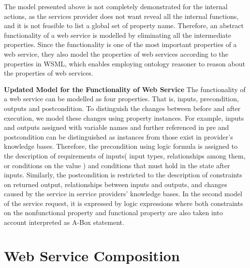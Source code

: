 The model presented above is not completely demonstrated for the internal actions, as the services provider does not want reveal all the internal functions, and it is not feasible to list a global set of property name. Therefore, an abstract functionality of a web service is modelled by eliminating all the intermediate properties. Since the functionality is one of the most important properties of a web service, they also model the properties of web services according to the properties in WSML, which enables employing ontology reasoner to reason about the properties of web services.

\textbf{Updated Model for the Functionality of Web Service } The functionality of a web service can be modelled as four properties. That is, inputs, precondition, outputs and postcondition. To distinguish the changes between before and after execution, we model these changes using property instances. For example, inputs and outputs assigned with variable names and further referenced in pre and postcondition can be distinguished as instances from those exist in provider's knowledge bases. Therefore, the precondition using logic formula is assigned to the description of requirements of inputs( input types, relationships among them, or conditions on the value ) and conditions that must hold in the state after inputs. Similarly, the postcondition is restricted to the description of constraints on returned output, relationships between inputs and outputs, and changes caused by the service in service providers' knowledge bases. In the second model of the service request, it is expressed by logic expressions where both constraints on the nonfunctional property and functional property are also taken into account interpreted as A-Box statement.





\section{Web Service Composition}\label{overview}

